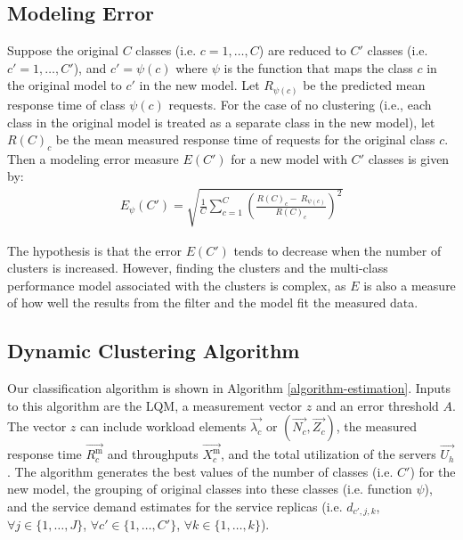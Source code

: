 \subsection{Modeling Error} 
\label{sec:modeling-error} 
Suppose the original $C$ classes (i.e. $c=1,\dots,C$) are reduced to $C'$ classes (i.e. $c'=1,\dots,C'$), and $c'=\psi(c)$ where $\psi$ is the function that maps the class $c$ in the original model to $c'$ in the new model. Let $R_{\psi(c)}$ be the predicted mean response time of class $\psi(c)$ requests. For the case of no clustering (i.e., each class in the original model is treated as a separate class in the new model), let ${R(C)}_c$ be the mean measured response time of requests for the original class $c$. Then a modeling error measure $E(C')$ for a new model with $C'$ classes is given by: 
\begin{align}    
	E_\psi(C')=\sqrt{\frac{1}{C}\sum^C_{c=1}{{\left(\frac{{R(C)}_c-\ R_{\psi\left(c\right)}}{{R(C)}_c}\right)}^2}}
		\label{eq:modeling-error}     
\end{align}  

The hypothesis is that the error $E(C')$ tends to decrease when the number of clusters is increased. However, finding the clusters and the multi-class performance model associated with the clusters is complex, as $E$ is also a measure of how well the results from the filter and the model fit the measured data.




\subsection{Dynamic Clustering Algorithm} 
\label{sec:dynamic-clustering-algorithm-sub} 
Our classification algorithm is shown in Algorithm \ref{algorithm-estimation}.  Inputs to this algorithm are the LQM, a measurement vector $z$ and an error threshold $A$. The vector $z$ can include workload elements $\overrightarrow{\lambda_c}$ or $(\overrightarrow{N_c},\overrightarrow{Z_c})$, the measured response time $\overrightarrow{R^\text{m}_c}$ and throughputs $\overrightarrow{X^\text{m}_c}$, and the total utilization of the servers $\overrightarrow{U_h}$. The algorithm generates the best values of the number of classes (i.e. $C'$) for the new model, the grouping of original classes into these  classes (i.e. function $\psi$), and the service demand estimates for the service replicas (i.e. $d_{c',j,k}$, $\forall j\in\{1, \dots,J\}$, $\forall c'\in\{1, \dots,C'\}$, $\forall k\in\{1, \dots,k\}$).



